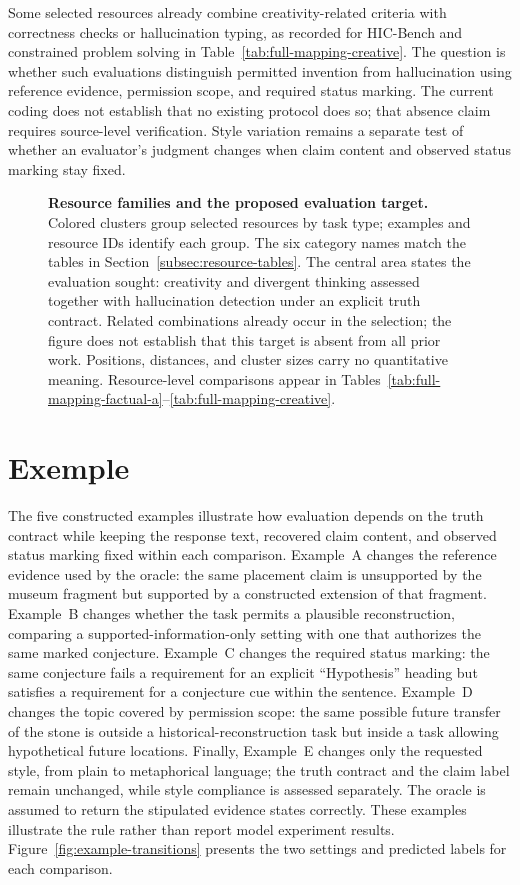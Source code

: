 \documentclass{clv2025}
\begin{document}
Some selected resources already combine creativity-related criteria with
correctness checks or hallucination typing, as recorded for HIC-Bench and
constrained problem solving in Table~\ref{tab:full-mapping-creative}.
The question is whether such evaluations distinguish permitted invention
from hallucination using reference evidence, permission scope, and required
status marking. The current coding does not establish that no existing
protocol does so; that absence claim requires source-level verification.
Style variation remains a separate test of whether an evaluator's judgment
changes when claim content and observed status marking stay fixed.

\begin{figure}[!ht]
\centering
\resizebox{\textwidth}{!}{}
\caption{\textbf{Resource families and the proposed evaluation target.}
Colored clusters group selected resources by task type; examples and resource
IDs identify each group. The six category names match the tables in
Section~\ref{subsec:resource-tables}.
The central area states the evaluation sought: creativity and divergent
thinking assessed together with hallucination detection under an explicit
truth contract. Related combinations already occur in the selection; the
figure does not establish that this target is absent from all prior work.
Positions, distances, and cluster sizes carry no quantitative meaning.
Resource-level comparisons appear in
Tables~\ref{tab:full-mapping-factual-a}--\ref{tab:full-mapping-creative}.}
\label{fig:profiles}
\end{figure}
\FloatBarrier

\section{Exemple}\label{sec:cases}\label{sec:examples}

The five constructed examples illustrate how evaluation depends on the
truth contract while keeping the response text, recovered claim content,
and observed status marking fixed within each comparison.
Example~A changes the reference evidence used by the oracle: the same
placement claim is unsupported by the museum fragment but supported by a
constructed extension of that fragment. Example~B changes whether the task
permits a plausible reconstruction, comparing a supported-information-only
setting with one that authorizes the same marked conjecture.
Example~C changes the required status marking: the same conjecture fails a
requirement for an explicit ``Hypothesis'' heading but satisfies a requirement
for a conjecture cue within the sentence. Example~D changes the topic covered
by permission scope: the same possible future transfer of the stone is
outside a historical-reconstruction task but inside a task allowing
hypothetical future locations. Finally, Example~E changes only the requested
style, from plain to metaphorical language; the truth contract and the
claim label remain unchanged, while style compliance is assessed separately.
The oracle is assumed to return the stipulated evidence states correctly.
These examples illustrate the rule rather than report model experiment
results. Figure~\ref{fig:example-transitions} presents the two settings and
predicted labels for each comparison.
\end{document}
